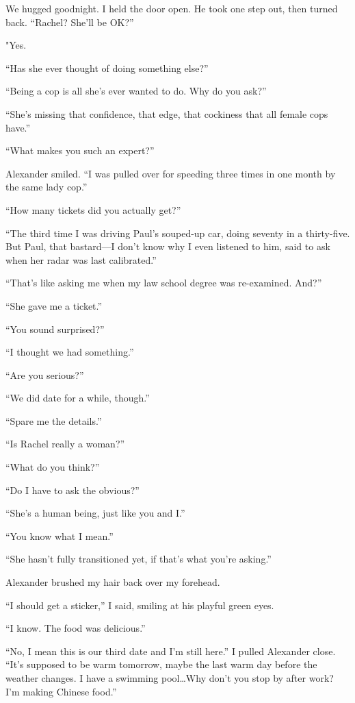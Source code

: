 We hugged goodnight. I held the door open. He took one step out, then
turned back. ``Rachel? She'll be OK?''

"Yes.

``Has she ever thought of doing something else?''

``Being a cop is all she's ever wanted to do. Why do you ask?''

``She's missing that confidence, that edge, that cockiness that all
female cops have.''

``What makes you such an expert?''

Alexander smiled. ``I was pulled over for speeding three times in one
month by the same lady cop.''

``How many tickets did you actually get?''

``The third time I was driving Paul's souped-up car, doing seventy in a
thirty-five. But Paul, that bastard---I don't know why I even listened
to him, said to ask when her radar was last calibrated.''

``That's like asking me when my law school degree was re-examined.
And?''

``She gave me a ticket.''

``You sound surprised?''

``I thought we had something.''

``Are you serious?''

``We did date for a while, though.''

``Spare me the details.''

``Is Rachel really a woman?''

``What do you think?''

``Do I have to ask the obvious?''

``She's a human being, just like you and I.''

``You know what I mean.''

``She hasn't fully transitioned yet, if that's what you're asking.''

Alexander brushed my hair back over my forehead.

``I should get a sticker,'' I said, smiling at his playful green eyes.

``I know. The food was delicious.''

``No, I mean this is our third date and I'm still here.'' I pulled
Alexander close. ``It's supposed to be warm tomorrow, maybe the last
warm day before the weather changes. I have a swimming pool\ldots Why
don't you stop by after work? I'm making Chinese food.''

